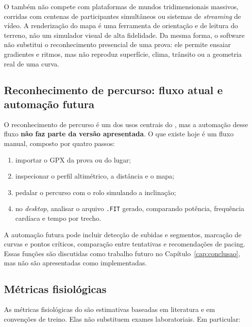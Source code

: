 O \argus{} também não compete com plataformas de mundos tridimensionais
massivos, corridas com centenas de participantes simultâneos ou sistemas de
\textit{streaming} de vídeo. A renderização do mapa é uma ferramenta de
orientação e de leitura do terreno, não um simulador visual de alta fidelidade.
Da mesma forma, o software não substitui o reconhecimento presencial de uma
prova: ele permite ensaiar gradientes e ritmos, mas não reproduz superfície,
clima, trânsito ou a geometria real de uma curva.

\subsection{Reconhecimento de percurso: fluxo atual e automação futura}
\label{sec:recon-atual}

O reconhecimento de percurso é um dos usos centrais do \argus{}, mas a
automação desse fluxo \textbf{não faz parte da versão apresentada}. O que existe
hoje é um fluxo manual, composto por quatro passos:

\begin{enumerate}
    \item importar o GPX da prova ou do lugar;
    \item inspecionar o perfil altimétrico, a distância e o mapa;
    \item pedalar o percurso com o rolo simulando a inclinação;
    \item no \textit{desktop}, analisar o arquivo \texttt{.FIT} gerado,
        comparando potência, frequência cardíaca e tempo por trecho.
\end{enumerate}

A automação futura pode incluir detecção de subidas e segmentos, marcação de
curvas e pontos críticos, comparação entre tentativas e recomendações de
pacing. Essas funções são discutidas como trabalho futuro no
Capítulo~\ref{cap:conclusao}, mas não são apresentadas como implementadas.

\subsection{Métricas fisiológicas}
\label{sec:metricas-delimitacoes}

As métricas fisiológicas do \argus{} são estimativas baseadas em literatura e
em convenções de treino. Elas não substituem exames laboratoriais. Em
particular:

